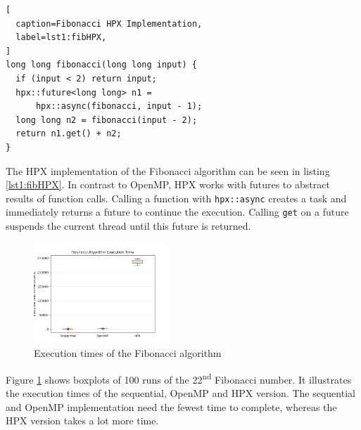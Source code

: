 \begin{lstlisting}[
  caption=Fibonacci HPX Implementation,
  label=lst1:fibHPX,
]
long long fibonacci(long long input) {
  if (input < 2) return input;
  hpx::future<long long> n1 =
      hpx::async(fibonacci, input - 1);
  long long n2 = fibonacci(input - 2);
  return n1.get() + n2;
}
\end{lstlisting}
  The HPX implementation of the Fibonacci algorithm can be seen in listing \ref{lst1:fibHPX}.
  In contrast to OpenMP, HPX works with futures to abstract results of function calls.
  Calling a function with \texttt{hpx::async} creates a task and immediately returns a future to continue the execution.
  Calling \texttt{get} on a future suspends the current thread until this future is returned.
\begin{figure}[htbp]
	\centering
	\includegraphics[width=0.45\textwidth]{figures/fib_NoOp.png}
	\caption{Execution times of the Fibonacci algorithm}
	\label{fig:fib_NoOp}
\end{figure}

Figure \ref{fig:fib_NoOp} shows boxplots of 100 runs of the 22\textsuperscript{nd} Fibonacci number.
It illustrates the execution times of the sequential, OpenMP and HPX version.
The sequential and OpenMP implementation need the fewest time to complete, whereas the HPX version takes a lot more time.
  \\
 
